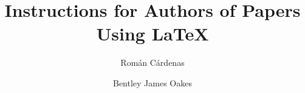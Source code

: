 \documentclass{scspaperproc}
\theoremstyle{scsthe}
\begin{document}
%
%

\def\SCSconferencename{Annual Modeling and Simulation Conference}

\def\SCSconferenceacro{ANNSIM'25}

\def\SCSpublicationyear{2025}

\def\SCSconferenceeditors{J.L. Risco-Martín, G. Rabadi, D. Cetinkaya, R. Cárdenas, S. Ferrero-Losada, and A.A. Abdelnabi}

\def\SCSconferencedates{May 26-29}

\def\SCSconferencevenue{Universidad Complutense de Madrid, Madrid, Spain}

\title{Instructions for Authors of Papers Using \LaTeX}

\author[\authorrefmark{1} \authorrefmark{2}]{Román Cárdenas}
\author[\authorrefmark{3}]{Bentley James Oakes}



\end{document}
